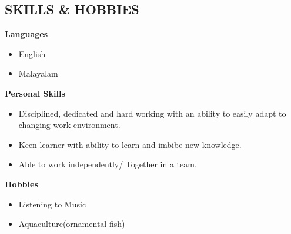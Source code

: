 \documentclass[line,margin]{res}
\begin{document}
\begin{resume}

    \section{SKILLS \& HOBBIES}
        {\bf Languages}
        \begin{itemize} \itemsep -2pt
        \item English
        \item Malayalam
        \end{itemize}
        {\bf Personal Skills}
        \begin{itemize} \itemsep -2pt
        \item Disciplined, dedicated and hard working with an ability to easily adapt to changing work environment.
        \item Keen learner with ability to learn and imbibe new knowledge.
        \item Able to work independently/ Together in a team.
        \end{itemize}
        {\bf Hobbies}
        \begin{itemize} \itemsep -2pt
        \item Listening to Music
        \item Aquaculture(ornamental-fish)
        \end{itemize}
\vspace{10 mm}                                 

\end{resume}
\end{document}
